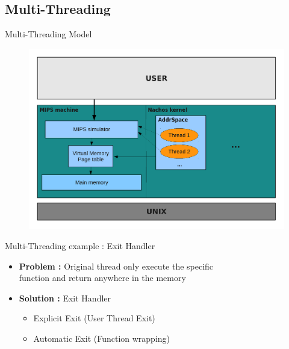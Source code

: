 \documentclass{beamer}
\begin{document}
\subsection{Multi-Threading}
\begin{frame}{Multi-Threading Model}
    \begin{figure}[ht]
        \includegraphics[width=0.8\linewidth]{threadschema.pdf}
    \end{figure}
\end{frame}

\begin{frame}{Multi-Threading example : Exit Handler}
    \begin{itemize}
        \item \textbf{Problem :} Original thread only execute the specific 
            \\function and return anywhere in the memory 
        \item \textbf{Solution :} Exit Handler
            \begin{itemize}
                \item Explicit Exit (User Thread Exit)
                \item Automatic Exit (Function wrapping)
            \end{itemize}
    \end{itemize}
\end{frame}
\end{document}
